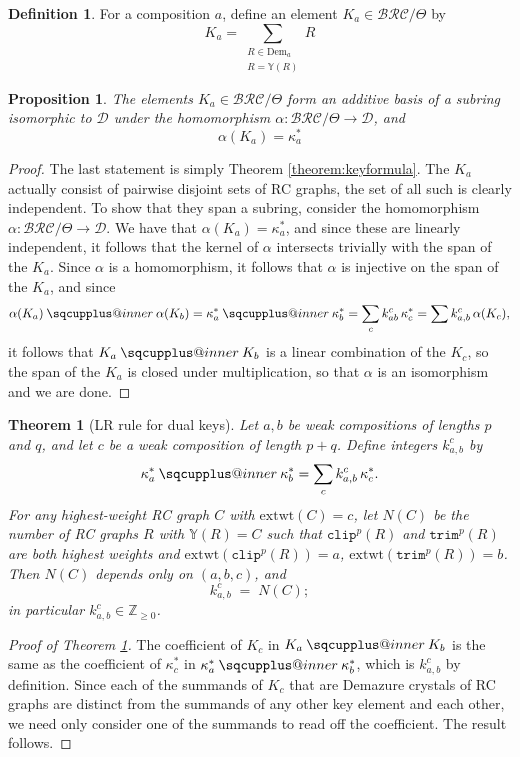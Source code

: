 \documentclass{amsart}
\makeatletter
\newcommand{\sqcupplus@inner}[2]{%
  \vcenter{\hbox{\ooalign{%
    \hfil$\m@th#1\sqcup$\hfil\cr
    \hfil\raisebox{0.15ex}{$\m@th#1\scriptscriptstyle+$}\hfil\cr
  }}}%
}
\newcommand{\sqcupplus}{\mathbin{\mathpalette\sqcupplus@inner\relax}}
\newtheorem{proposition}[lemma]{Proposition}
\newtheorem{theorem}{Theorem}[section]
\theoremstyle{definition}
\newtheorem{definition}[lemma]{Definition}
\theoremstyle{remark}
\numberwithin{equation}{subsection}
\newcommand{\trm}{\mathtt{trim}}
\newcommand{\clp}{\mathtt{clip}}
\newcommand{\BRC}{\mathcal{BRC}}
\newcommand{\dcoma}{\mathcal{D}}
\makeatother
\begin{document}
\begin{definition}
For a composition $a$, define  an element $K_a\in\BRC/\Theta$ by
$$K_a =\sum_{\substack{R\in\mathrm{Dem}_a\\ R=\mathbb{Y}(R)}} R$$
\end{definition}

\begin{proposition}
The elements $K_a\in\BRC/\Theta$ form an additive basis of a subring isomorphic to $\dcoma$ under the homomorphism $\alpha:\BRC/\Theta\to \dcoma$, and 
$$\alpha(K_a) = \kappa_a^*$$
\end{proposition}
\begin{proof}
The last statement is simply Theorem \ref{theorem:keyformula}. The $K_a$ actually consist of pairwise disjoint sets of RC graphs, the set of all such is clearly independent. To show that they span a subring, consider the homomorphism $\alpha:\BRC/\Theta\to \dcoma$. We have that $\alpha(K_a)=\kappa_a^*$, and since these are linearly independent, it follows that the kernel of $\alpha$ intersects trivially with the span of the $K_a$. Since $\alpha$ is a homomorphism, it follows that $\alpha$ is injective on the span of the $K_a$, and since 
$$\alpha(K_a)\sqcupplus\alpha(K_b) = \kappa_a^*\sqcupplus\kappa_b^*=\sum_{c}k_{ab}^c\,\kappa_c^*=\sum k_{a,b}^c\,\alpha(K_c),$$ 
it follows that $K_a\sqcupplus K_b$ is a linear combination of the $K_c$, so the span of the $K_a$ is closed under multiplication, so that $\alpha$ is an isomorphism and we are done.
\end{proof}

\begin{theorem}[LR rule for dual keys]\label{theorem:LRkey}
Let $a,b$ be weak compositions of lengths $p$ and $q$, and let $c$ be a weak composition of length $p+q$. Define integers $k_{a,b}^c$ by
$$\kappa_a^* \sqcupplus \kappa_b^* = \sum_{c} k_{a,b}^c\,\kappa_c^*.$$
For any highest-weight RC graph $C$ with $\mathrm{extwt}(C)=c$, let $N(C)$ be the number of RC graphs $R$ with $\mathbb{Y}(R)=C$ such that $\clp^p(R)$ and $\trm^p(R)$ are both highest weights and $\mathrm{extwt}(\clp^p(R)) = a$, $\mathrm{extwt}(\trm^p(R)) = b$. Then $N(C)$ depends only on $(a,b,c)$, and
$$k_{a,b}^c \;=\; N(C);$$
in particular $k_{a,b}^c\in\mathbb{Z}_{\geq 0}$.
\end{theorem}

\begin{proof}[Proof of Theorem \ref{theorem:LRkey}]
  The coefficient of $K_c$ in $K_a\sqcupplus K_b$ is the same as the coefficient of $\kappa_c^*$ in $\kappa_a^*\sqcupplus\kappa_b^*$, which is $k_{a,b}^c$ by definition. Since each of the summands of $K_c$ that are Demazure crystals of RC graphs are distinct from the summands of any other key element and each other, we need only consider one of the summands to read off the coefficient. The result follows.
\end{proof}
\end{document}
